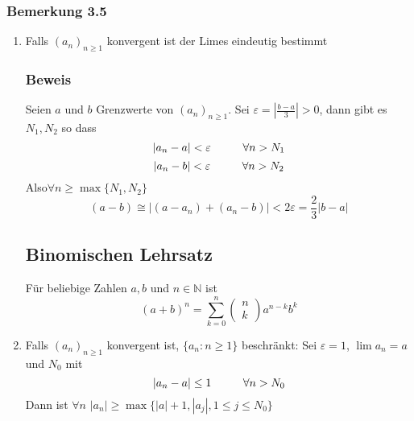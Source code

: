 \subsubsection*{Bemerkung 3.5}
\begin{enumerate}
\item Falls $(a_n)_{n\geq 1}$ konvergent ist der Limes eindeutig bestimmt
\subsubsection*{Beweis}
Seien $a$ und $b$ Grenzwerte von $(a_n)_{n\geq 1}$. Sei $\varepsilon = \left| \frac{b-a}{3}\right|>0$, dann gibt es $N_1,N_2$ so dass \[\left| a_n-a\right| <\varepsilon\hspace{10mm}\forall n>N_1\]\[\left| a_n-b\right| <\varepsilon\hspace{10mm}\forall n>N_2\]
Also$ \forall n\geq \max\{ N_1,N_2\}$ \[(a-b)\cong\left| (a-a_n)+(a_n-b)\right| < 2\varepsilon=\frac{2}{3}\left|b-a\right|\]
\subsection*{Binomischen Lehrsatz}
Für beliebige Zahlen $a,b$ und $n\in\mathbb{N}$ ist \[{\left( {a + b} \right)^n} = \sum\limits_{k = 0}^n {\left( {\begin{array}{*{20}{c}}
n\\
k
\end{array}} \right){a^{n - k}}{b^k}} \]
\item Falls $(a_n)_{n\geq 1}$ konvergent ist, $\{a_n:n\geq 1\}$ beschränkt: Sei $\varepsilon=1$, $\lim a_n=a$ und $N_0$ mit \[\left| a_n-a\right| \leq 1\hspace{10mm} \forall n>N_0\] Dann ist $\forall n$ $\left| a_n\right| \geq \max\{\left| a\right| +1,\left| a_j\right|, 1\leq j\leq N_0  \}$
\end{enumerate}
